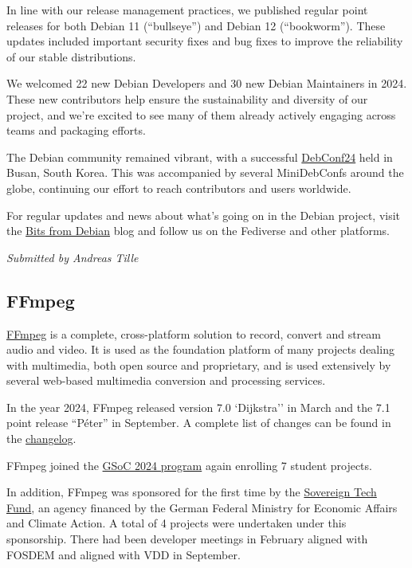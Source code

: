 \documentclass[a4paper]{report}
\begin{document}
In line with our release management practices, we published regular point releases for both Debian 11 (``bullseye'') and Debian 12 (``bookworm''). These updates included important security fixes and bug fixes to improve the reliability of our stable distributions.

We welcomed 22 new Debian Developers and 30 new Debian Maintainers in 2024. These new contributors help ensure the sustainability and diversity of our project, and we’re excited to see many of them already actively engaging across teams and packaging efforts.

The Debian community remained vibrant, with a successful \href{https://debconf24.debconf.org/}{DebConf24} held in Busan, South Korea. This was accompanied by several MiniDebConfs around the globe, continuing our effort to reach contributors and users worldwide.

For regular updates and news about what’s going on in the Debian project, visit the \href{https://bits.debian.org/}{Bits from Debian} blog and follow us on the Fediverse and other platforms.

{\em Submitted by Andreas Tille}

\subsection{FFmpeg}

\href{https://www.ffmpeg.org}{FFmpeg} is a complete, cross-platform solution to record, convert and stream audio and video. It is used as the foundation platform of many projects dealing with multimedia, both open source and proprietary, and is used extensively by several web-based multimedia conversion and processing services.

In the year 2024, FFmpeg released version 7.0 `Dijkstra'' in March and the 7.1 point release ``Péter'' in September. A complete list of changes can be found in the \href{https://git.ffmpeg.org/gitweb/ffmpeg.git/blob/HEAD:/Changelog}{changelog}.

FFmpeg joined the \href{https://summerofcode.withgoogle.com/programs/2024/organizations/ffmpeg}{GSoC 2024 program} again enrolling 7 student projects.

In addition, FFmpeg was sponsored for the first time by the \href{https://www.sovereign.tech/tech/ffmpeg}{Sovereign Tech Fund}, an agency financed by the German Federal Ministry for Economic Affairs and Climate Action. A total of 4 projects were undertaken under this sponsorship. There had been developer meetings in February aligned with FOSDEM and aligned with VDD in September.
\end{document}
